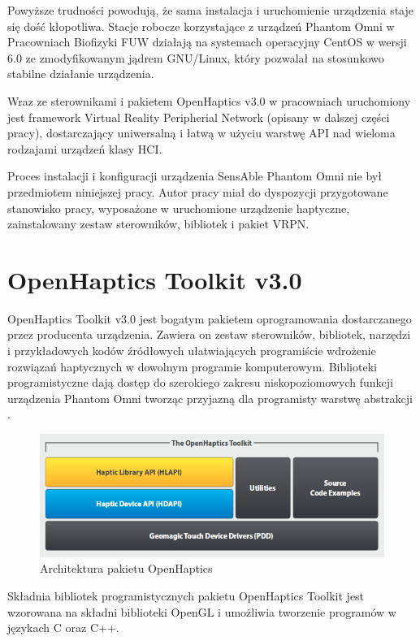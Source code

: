 \documentclass[licencjacka]{pracamgr}
\begin{document}
Powyższe trudności powodują, że sama instalacja i uruchomienie urządzenia staje się dość kłopotliwa. Stacje robocze korzystające z urządzeń Phantom Omni w Pracowniach Biofizyki FUW działają na systemach operacyjny CentOS w wersji 6.0 ze zmodyfikowanym jądrem GNU/Linux, który pozwalał na stosunkowo stabilne działanie urządzenia. 

Wraz ze sterownikami i pakietem OpenHaptics v3.0 w pracowniach uruchomiony jest framework Virtual Reality Peripherial Network (opisany w dalszej części pracy), dostarczający uniwersalną i łatwą w użyciu warstwę API nad wieloma rodzajami urządzeń klasy HCI. 

Proces instalacji i konfiguracji urządzenia SensAble Phantom Omni nie był przedmiotem niniejszej pracy. Autor pracy miał do dyspozycji przygotowane stanowisko pracy, wyposażone w uruchomione urządzenie haptyczne, zainstalowany zestaw sterowników, bibliotek i pakiet VRPN.

\section{OpenHaptics Toolkit v3.0}

OpenHaptics Toolkit v3.0 jest bogatym pakietem oprogramowania dostarczanego przez producenta urządzenia. Zawiera on zestaw sterowników, bibliotek, narzędzi i przykładowych kodów źródłowych ułatwiających programiście wdrożenie rozwiązań haptycznych w dowolnym programie komputerowym. Biblioteki programistyczne dają dostęp do szerokiego zakresu niskopoziomowych funkcji urządzenia Phantom Omni tworząc przyjazną dla programisty warstwę abstrakcji \cite{openHapticsBrochure}\cite{openHapticsProgrammersGuide}. 

\begin{figure}[H]
\centering
\includegraphics[scale=0.5,center]{openhaptics}
\caption{Architektura pakietu OpenHaptics}
\end{figure}

Składnia bibliotek programistycznych pakietu OpenHaptics Toolkit jest wzorowana na składni biblioteki OpenGL i umożliwia tworzenie programów w językach C oraz C++. 
\end{document}
